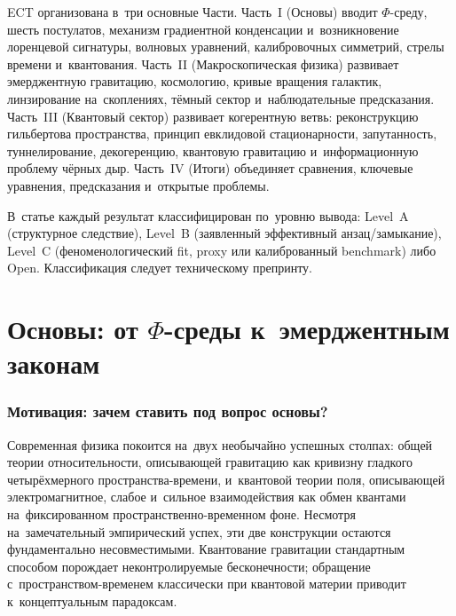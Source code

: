 \documentclass[11pt,a4paper]{article}
\begin{document}
ECT организована в~три основные Части. Часть~I (Основы) вводит $\Phi$-среду, шесть постулатов, механизм градиентной конденсации и~возникновение лоренцевой сигнатуры, волновых уравнений, калибровочных симметрий, стрелы времени и~квантования. Часть~II (Макроскопическая физика) развивает эмерджентную гравитацию, космологию, кривые вращения галактик, линзирование на~скоплениях, тёмный сектор и~наблюдательные предсказания. Часть~III (Квантовый сектор) развивает когерентную ветвь: реконструкцию гильбертова пространства, принцип евклидовой стационарности, запутанность, туннелирование, декогеренцию, квантовую гравитацию и~информационную проблему чёрных дыр. Часть~IV (Итоги) объединяет сравнения, ключевые уравнения, предсказания и~открытые проблемы.

В~статье каждый результат классифицирован по~уровню вывода: Level~A (структурное следствие), Level~B (заявленный эффективный анзац/замыкание), Level~C (феноменологический fit, proxy или калиброванный benchmark) либо Open. Классификация следует техническому препринту.

\medskip
\noindent{}

\part{Основы: от $\Phi$-среды к~эмерджентным законам}
\label{part:foundations_pop}

\section{Мотивация: зачем ставить под вопрос основы?}
\label{sec:pop_motivation}

Современная физика покоится на~двух необычайно успешных столпах: общей теории относительности, описывающей гравитацию как кривизну гладкого четырёхмерного пространства-времени, и~квантовой теории поля, описывающей электромагнитное, слабое и~сильное взаимодействия как обмен квантами на~фиксированном пространственно-временном фоне. Несмотря на~замечательный эмпирический успех, эти две конструкции остаются фундаментально несовместимыми. Квантование гравитации стандартным способом порождает неконтролируемые бесконечности; обращение с~пространством-временем классически при квантовой материи приводит к~концептуальным парадоксам.
\end{document}
